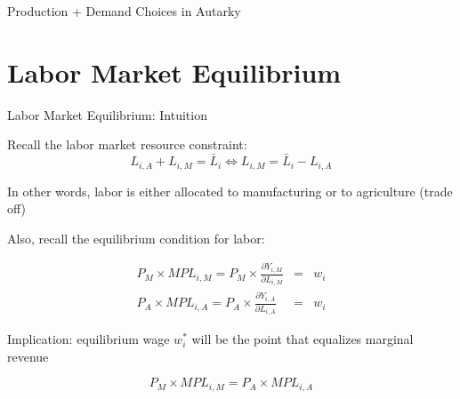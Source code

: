 \documentclass[notes,11pt, aspectratio=169, xcolor=table]{beamer}
\newenvironment{wideitemize}{\itemize\addtolength{\itemsep}{10pt}}{\enditemize}
\begin{document}
\begin{frame}{Production + Demand Choices in Autarky}
    
\end{frame}


\section{Labor Market Equilibrium}

\begin{frame}{Labor Market Equilibrium: Intuition}
\begin{wideitemize}
    \item Recall the labor market resource constraint:
        \begin{equation*}
            L_{i,A} + L_{i,M} = \bar{L}_{i} \iff L_{i,M} = \bar{L}_{i} - L_{i,A}  
        \end{equation*}

    \item<2-> In other words, labor is either allocated to manufacturing or to agriculture (trade off)

    \item<3-> Also, recall the equilibrium condition for labor:

            \begin{eqnarray*}
            P_M \times MPL_{i,M} = P_M \times  \frac{\partial Y_{i,M}}{\partial L_{i,M}} &=& w_i\\
            P_A \times MPL_{i,A} = P_A \times  \frac{\partial Y_{i,A}}{\partial L_{i,A}} &=& w_i  
        \end{eqnarray*}

    \item<4-> Implication: equilibrium wage $w_i^*$ will be the point that equalizes marginal revenue 

    \begin{equation*}
        P_M \times MPL_{i,M}  =  P_A \times MPL_{i,A}
    \end{equation*}

\end{wideitemize}
    
\end{frame}
\end{document}
